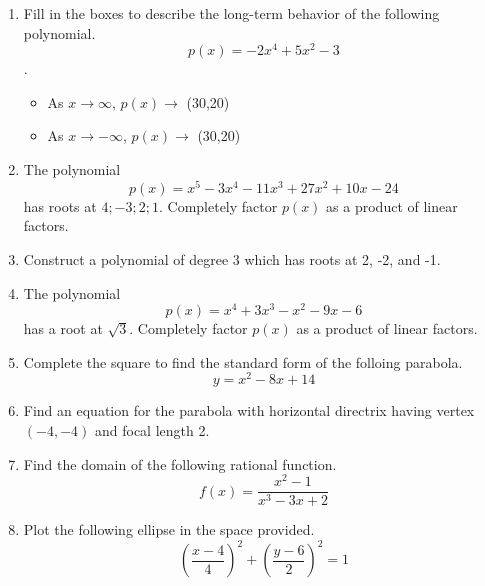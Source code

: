 \documentclass{article}
\begin{document}
\ReviewTitle[class={College Algebra}, for={Test 3}]

\begin{enumerate}
\item Fill in the boxes to describe the long-term behavior of the following polynomial. \[ p(x) = -2x^4 + 5x^2 - 3 \].

\begin{itemize}
\item As $x \rightarrow \infty$, $p(x) \rightarrow$ \framebox(30,20){} \vspace{0.5cm}
\item As $x \rightarrow -\infty$, $p(x) \rightarrow$ \framebox(30,20){}
\end{itemize} \vspace{1cm}

\item The polynomial \[ p(x) = x^5 - 3x^4 - 11x^3 + 27x^2 + 10x - 24 \] has roots at ${4;-3;2;1}$. Completely factor $p(x)$ as a product of linear factors. \vspace{6cm}

\item Construct a polynomial of degree 3 which has roots at 2, -2, and -1. \vspace{5cm}

\newpage

\item The polynomial \[ p(x) = x^4 + 3x^3 - x^2 - 9x - 6 \] has a root at $\sqrt{3}$. Completely factor $p(x)$ as a product of linear factors. \vspace{9cm}

\item Complete the square to find the standard form of the folloing parabola. \[ y = x^2 - 8x + 14 \] \vspace{6cm}

\item Find an equation for the parabola with horizontal directrix having vertex $(-4, -4)$ and focal length 2. \vspace{2cm}

\newpage

\item Find the domain of the following rational function. \[ f(x) = \frac{x^2 - 1}{x^3 - 3x + 2} \] \vspace{5cm}

\item Plot the following ellipse in the space provided. \[ \left(\frac{x - 4}{4}\right)^2 + \left(\frac{y - 6}{2}\right)^2 = 1 \]


\end{enumerate}
\end{document}
